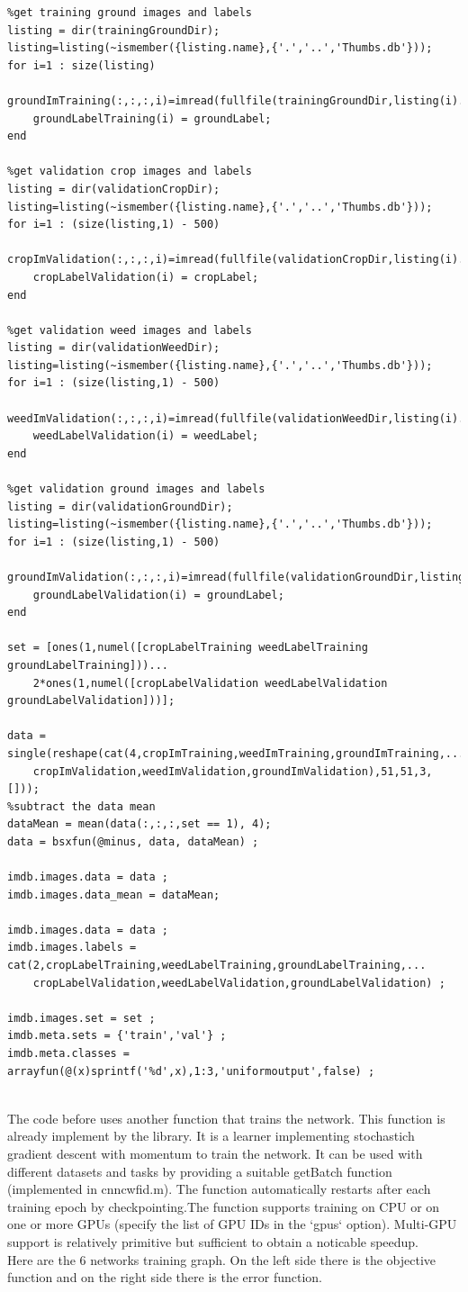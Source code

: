 \documentclass[]{report}
\begin{document}
\begin{lstlisting}
%get training ground images and labels
listing = dir(trainingGroundDir);
listing=listing(~ismember({listing.name},{'.','..','Thumbs.db'}));
for i=1 : size(listing)
    groundImTraining(:,:,:,i)=imread(fullfile(trainingGroundDir,listing(i).name));
    groundLabelTraining(i) = groundLabel;
end

%get validation crop images and labels
listing = dir(validationCropDir);
listing=listing(~ismember({listing.name},{'.','..','Thumbs.db'}));
for i=1 : (size(listing,1) - 500)
    cropImValidation(:,:,:,i)=imread(fullfile(validationCropDir,listing(i).name));
    cropLabelValidation(i) = cropLabel;
end

%get validation weed images and labels
listing = dir(validationWeedDir);
listing=listing(~ismember({listing.name},{'.','..','Thumbs.db'}));
for i=1 : (size(listing,1) - 500)
    weedImValidation(:,:,:,i)=imread(fullfile(validationWeedDir,listing(i).name));
    weedLabelValidation(i) = weedLabel;
end

%get validation ground images and labels
listing = dir(validationGroundDir);
listing=listing(~ismember({listing.name},{'.','..','Thumbs.db'}));
for i=1 : (size(listing,1) - 500)
    groundImValidation(:,:,:,i)=imread(fullfile(validationGroundDir,listing(i).name));
    groundLabelValidation(i) = groundLabel;
end

set = [ones(1,numel([cropLabelTraining weedLabelTraining groundLabelTraining]))...
    2*ones(1,numel([cropLabelValidation weedLabelValidation groundLabelValidation]))];

data = single(reshape(cat(4,cropImTraining,weedImTraining,groundImTraining,...
    cropImValidation,weedImValidation,groundImValidation),51,51,3,[]));
%subtract the data mean 
dataMean = mean(data(:,:,:,set == 1), 4);
data = bsxfun(@minus, data, dataMean) ;

imdb.images.data = data ;
imdb.images.data_mean = dataMean;

imdb.images.data = data ;
imdb.images.labels = cat(2,cropLabelTraining,weedLabelTraining,groundLabelTraining,...
    cropLabelValidation,weedLabelValidation,groundLabelValidation) ;

imdb.images.set = set ;
imdb.meta.sets = {'train','val'} ;
imdb.meta.classes = arrayfun(@(x)sprintf('%d',x),1:3,'uniformoutput',false) ;


\end{lstlisting}

The code before uses another function that trains the network. This function is already implement by the library. It is a learner implementing stochastich gradient descent with momentum to train the network. 
It can be used with different datasets and tasks by providing a suitable getBatch function (implemented in  cnn\textunderscore cwfid.m). The function automatically restarts after each training epoch by checkpointing.The function supports training on CPU or on one or more GPUs (specify the list of GPU IDs in the `gpus` option). Multi-GPU support is relatively primitive but sufficient to obtain a noticable speedup.\\
Here are the 6 networks training graph. On the left side there is the objective function and on the right side there is the error function.
\end{document}
